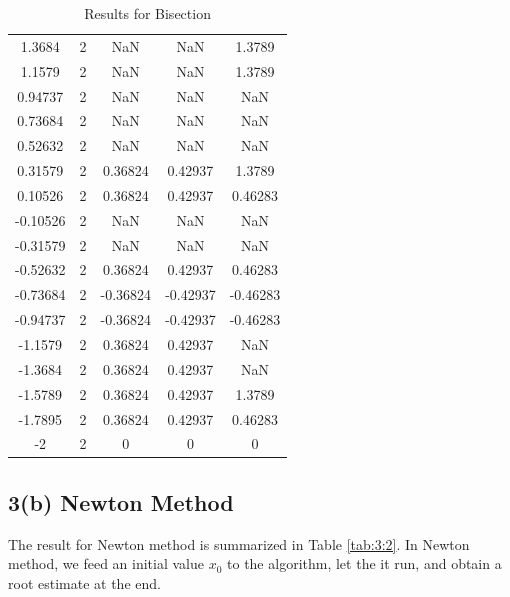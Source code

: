 \documentclass[11pt]{article}
\newcommand{\1}{\mathbbm{1}}
\begin{document}
\begin{table}[H]
\begin{tabular}{c c |c c c }
		1.3684  &         2  &       NaN &        NaN  &    1.3789\\
		1.1579  &         2  &       NaN &        NaN  &    1.3789\\
		0.94737  &         2  &       NaN &        NaN  &       NaN\\
		0.73684  &         2  &       NaN &        NaN  &       NaN\\
		0.52632  &         2  &       NaN &        NaN  &       NaN\\
		0.31579  &         2  &   0.36824 &    0.42937  &    1.3789\\
		0.10526  &         2  &   0.36824 &    0.42937  &   0.46283\\
		-0.10526  &         2  &       NaN &        NaN  &       NaN\\
		-0.31579  &         2  &       NaN &        NaN  &       NaN\\
		-0.52632  &         2  &   0.36824 &    0.42937  &   0.46283\\
		-0.73684  &         2  &  -0.36824 &   -0.42937  &  -0.46283\\
		-0.94737  &         2  &  -0.36824 &   -0.42937  &  -0.46283\\
		-1.1579  &         2  &   0.36824 &    0.42937  &       NaN\\
		-1.3684  &         2  &   0.36824 &    0.42937  &       NaN\\
		-1.5789  &         2  &   0.36824 &    0.42937  &    1.3789\\
		-1.7895  &         2  &   0.36824 &    0.42937  &   0.46283\\
		-2  &         2  &         0 &          0  &         0\\
		\hline
		\hline
	\end{tabular} 
	\caption{Results for Bisection}
	\label{tab:3:1}
\end{table}

\subsection*{3(b) Newton Method}
The result for Newton method is summarized in Table \ref{tab:3:2}. In Newton method, we feed an initial value $x_0$ to the algorithm, let the it run, and obtain a root estimate at the end.
\end{document}
